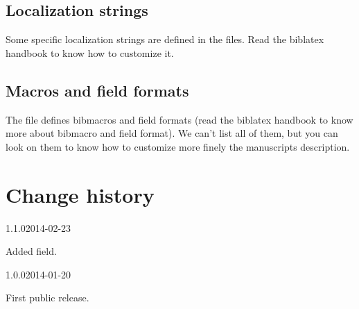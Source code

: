 \documentclass{ltxdockit}[2011/03/25]
\newcommand{\biblatex}{biblatex\xspace}
\begin{document}
\subsection{Localization strings}

Some specific localization strings are defined in the  files. Read the \biblatex handbook to know how to customize it.

\subsection{Macros and field formats}

The  file defines bibmacros and field formats (read the \biblatex handbook to know more about bibmacro and field format). We can't list all of them, but you can look on them to know how to customize more finely the manuscripts description.

\section{Change history}

\begin{changelog}

\begin{release}{1.1.0}{2014-02-23}
\item Added  field.
\end{release}

\begin{release}{1.0.0}{2014-01-20}
\item First public release.
\end{release}
\end{changelog}
\end{document}
